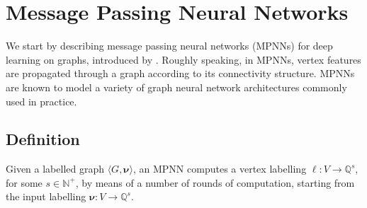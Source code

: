 
\section{Message Passing Neural Networks}\label{sec:MPNNs}
We start by describing message passing neural networks (MPNNs) for  deep
learning on graphs, introduced by \cite{GilmerSRVD17}. Roughly speaking, in
MPNNs, vertex features are propagated through a graph according to its
connectivity structure. MPNNs are known to model a variety of graph neural
network architectures commonly used in practice.

\subsection{Definition}
Given a labelled graph $\langle G,\pmb{\nu}\rangle$, an MPNN computes a vertex
labelling $\pmb{\ell}:V\to \mathbb{Q}^{s}$, for some $s\in\mathbb{N}^+$, by
means of a number of rounds of computation, starting from the input labelling
$\pmb{\nu}:V\to\mathbb{Q}^s$.

